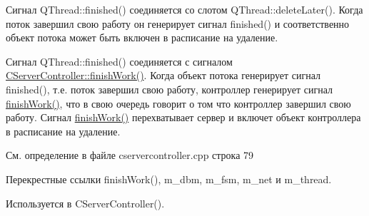 Сигнал Q\+Thread\+::finished() соединяется со слотом Q\+Thread\+::delete\+Later(). Когда поток завершил свою работу он генерирует сигнал finished() и соответственно объект потока может быть включен в расписание на удаление.

Сигнал Q\+Thread\+::finished() соединяется с сигналом \hyperlink{class_c_server_controller_a49ac8bb325430fc9112056d862c5c117}{C\+Server\+Controller\+::finish\+Work()}. Когда объект потока генерирует сигнал finished(), т.\+е. поток завершил свою работу, контроллер генерирует сигнал \hyperlink{class_c_server_controller_a49ac8bb325430fc9112056d862c5c117}{finish\+Work()}, что в свою очередь говорит о том что контроллер завершил свою работу. Сигнал \hyperlink{class_c_server_controller_a49ac8bb325430fc9112056d862c5c117}{finish\+Work()} перехватывает сервер и включет объект контроллера в расписание на удаление.

См. определение в файле cservercontroller.\+cpp строка 79



Перекрестные ссылки finish\+Work(), m\+\_\+dbm, m\+\_\+fsm, m\+\_\+net и m\+\_\+thread.



Используется в C\+Server\+Controller().


